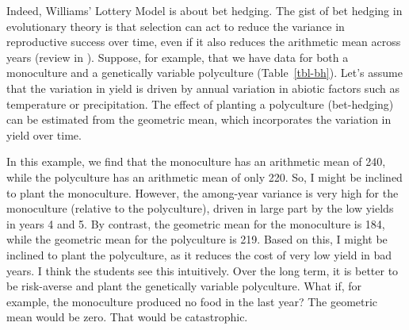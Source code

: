 \documentclass[
  letterpaper,
]{book}
\begin{document}
Indeed, Williams' Lottery Model is about bet hedging. The gist of bet
hedging in evolutionary theory is that selection can act to reduce the
variance in reproductive success over time, even if it also reduces the
arithmetic mean across years (review in
). Suppose, for
example, that we have data for both a monoculture and a genetically
variable polyculture (Table~\ref{tbl-bh}). Let's assume that the
variation in yield is driven by annual variation in abiotic factors such
as temperature or precipitation. The effect of planting a polyculture
(bet-hedging) can be estimated from the geometric mean, which
incorporates the variation in yield over time.

In this example, we find that the monoculture has an arithmetic mean of
240, while the polyculture has an arithmetic mean of only 220. So, I
might be inclined to plant the monoculture. However, the among-year
variance is very high for the monoculture (relative to the polyculture),
driven in large part by the low yields in years 4 and 5. By contrast,
the geometric mean for the monoculture is 184, while the geometric mean
for the polyculture is 219. Based on this, I might be inclined to plant
the polyculture, as it reduces the cost of very low yield in bad years.
I think the students see this intuitively. Over the long term, it is
better to be risk-averse and plant the genetically variable polyculture.
What if, for example, the monoculture produced no food in the last year?
The geometric mean would be zero. That would be catastrophic.
\end{document}
